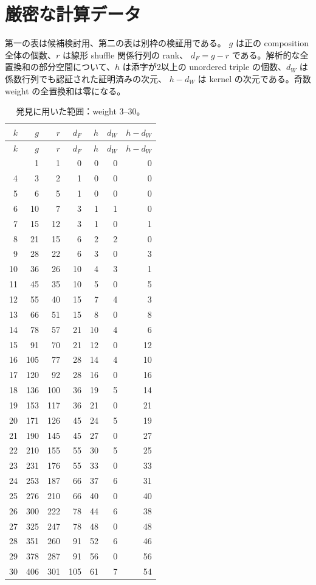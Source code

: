 \documentclass[12pt]{amsart}
\theoremstyle{definition}
\theoremstyle{remark}
\numberwithin{equation}{section}
\numberwithin{equation}{section}
\begin{document}
\section{厳密な計算データ}
第一の表は候補検討用、第二の表は別枠の検証用である。
$g$ は正の composition 全体の個数、$r$ は線形 shuffle 関係行列の rank、
$d_F=g-r$ である。解析的な全置換和の部分空間について、$h$ は添字が2以上の
unordered triple の個数、$d_W$ は係数行列でも認証された証明済みの次元、
$h-d_W$ は kernel の次元である。奇数 weight の全置換和は零になる。
\begingroup\small
\begin{longtable}{rrrrrrr}
\caption{発見に用いた範囲：weight 3--30。}\\
\toprule $k$ & $g$ & $r$ & $d_F$ & $h$ & $d_W$ & $h-d_W$\\\midrule\endfirsthead
\toprule $k$ & $g$ & $r$ & $d_F$ & $h$ & $d_W$ & $h-d_W$\\\midrule\endhead
\bottomrule\endfoot
3 & 1 & 1 & 0 & 0 & 0 & 0\\
4 & 3 & 2 & 1 & 0 & 0 & 0\\
5 & 6 & 5 & 1 & 0 & 0 & 0\\
6 & 10 & 7 & 3 & 1 & 1 & 0\\
7 & 15 & 12 & 3 & 1 & 0 & 1\\
8 & 21 & 15 & 6 & 2 & 2 & 0\\
9 & 28 & 22 & 6 & 3 & 0 & 3\\
10 & 36 & 26 & 10 & 4 & 3 & 1\\
11 & 45 & 35 & 10 & 5 & 0 & 5\\
12 & 55 & 40 & 15 & 7 & 4 & 3\\
13 & 66 & 51 & 15 & 8 & 0 & 8\\
14 & 78 & 57 & 21 & 10 & 4 & 6\\
15 & 91 & 70 & 21 & 12 & 0 & 12\\
16 & 105 & 77 & 28 & 14 & 4 & 10\\
17 & 120 & 92 & 28 & 16 & 0 & 16\\
18 & 136 & 100 & 36 & 19 & 5 & 14\\
19 & 153 & 117 & 36 & 21 & 0 & 21\\
20 & 171 & 126 & 45 & 24 & 5 & 19\\
21 & 190 & 145 & 45 & 27 & 0 & 27\\
22 & 210 & 155 & 55 & 30 & 5 & 25\\
23 & 231 & 176 & 55 & 33 & 0 & 33\\
24 & 253 & 187 & 66 & 37 & 6 & 31\\
25 & 276 & 210 & 66 & 40 & 0 & 40\\
26 & 300 & 222 & 78 & 44 & 6 & 38\\
27 & 325 & 247 & 78 & 48 & 0 & 48\\
28 & 351 & 260 & 91 & 52 & 6 & 46\\
29 & 378 & 287 & 91 & 56 & 0 & 56\\
30 & 406 & 301 & 105 & 61 & 7 & 54\\
\end{longtable}
\end{document}
